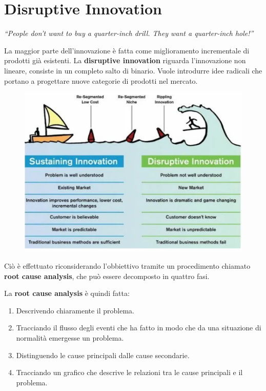 \documentclass[a4paper,11pt,oneside]{book}
\begin{document}
\pagebreak

\section{Disruptive Innovation}
\begin{flushleft}
	\textit{“People don’t want to buy a quarter-inch drill. They want a quarter-inch hole!”}
\end{flushleft}
La maggior parte dell'innovazione è fatta come miglioramento incrementale di prodotti già esistenti. La \textbf{disruptive innovation} riguarda l'innovazione non lineare, consiste in un completo salto di binario. Vuole introdurre idee radicali che portano a progettare nuove categorie di prodotti nel mercato.

\begin{figure}[!h]
	\centering
	\includegraphics[scale=0.6]{immagini/Disruptive Innovation.png}
\end{figure}

Ciò è effettuato riconsiderando l'obbiettivo tramite un procedimento chiamato \textbf{root cause analysis}, che può essere decomposto in quattro fasi.

La \textbf{root cause analysis} è quindi fatta:

\begin{enumerate}
	\item Descrivendo chiaramente il problema.
	\item Tracciando il flusso degli eventi che ha fatto in modo che da una situazione di normalità emergesse un problema.
	\item Distinguendo le cause principali dalle cause secondarie.
	\item Tracciando un grafico che descrive le relazioni tra le cause principali e il problema.
\end{enumerate}
\end{document}
